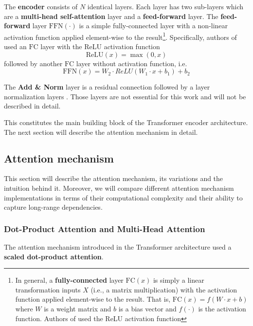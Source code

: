 \documentclass[a4paper, twoside]{report}
\theoremstyle{definition}
\numberwithin{equation}{section}
\begin{document}
The \textbf{encoder} consists of $N$ identical layers. Each layer has two sub-layers which are a
\textbf{multi-head self-attention} layer and
a \textbf{feed-forward} layer.
The \textbf{feed-forward} layer $\text{FFN}(\cdot)$ is a simple fully-connected layer
with a non-linear activation function applied element-wise to the
result\footnote{
    In general, a \textbf{fully-connected} layer $\text{FC}(x)$ is simply a linear transformation inputs $X$ (i.e., a matrix multiplication) with the activation function applied element-wise to the result.
    That is, $\text{FC}(x)=f(W\cdot x + b)$ where $W$ is a weight matrix and $b$ is a bias vector and $f(\cdot)$ is the activation function.
    Authors of \cite{1706.03762} used the ReLU activation function
}.
Specifically, authors of \cite{1706.03762} used an $\text{FC}$ layer with
the ReLU activation function $$\text{ReLU}(x)=\max(0, x)$$
followed by another $\text{FC}$ layer without activation function, i.e.
$$\text{FFN}(x)=W_2 \cdot ReLU(W_1\cdot x+b_1)+b_2$$

The \textbf{Add \& Norm} layer is a residual connection \cite{1512.03385} followed by a layer normalization layers \cite{1607.06450}.
Those layers are not essential for this work and will not be described in detail.

This constitutes the main building block of the Transformer encoder architecture.
The next section will describe the attention mechanism in detail.


\subsection{Attention mechanism} \label{sec:attention_mechanism}

This section will describe the attention mechanism, its variations and the intuition behind it.
Moreover, we will compare different attention mechanism implementations in terms of
their computational complexity and their ability to capture long-range dependencies.

\subsubsection{Dot-Product Attention and Multi-Head Attention}

The attention mechanism introduced in the Transformer architecture \cite{1706.03762} used a \textbf{scaled dot-product attention}.
\end{document}
